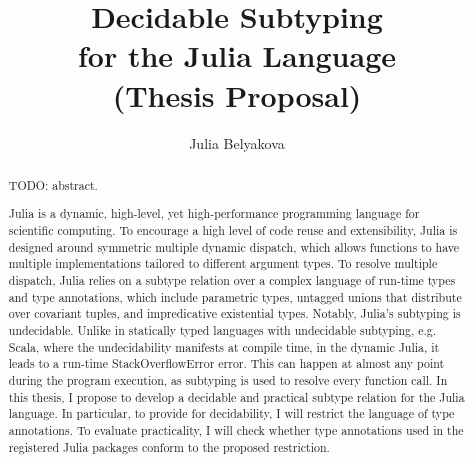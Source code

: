 \title{Decidable Subtyping\\for the Julia Language\\ (Thesis Proposal)}

\author{Julia Belyakova}

\date{}

\maketitle


\begin{abstract}
  TODO: abstract.

Julia is a dynamic, high-level, yet high-performance programming language
for scientific computing.
To encourage a high level of code reuse and extensibility, Julia is
designed around symmetric multiple dynamic dispatch, which allows functions
to have multiple implementations tailored to different argument types.
To resolve multiple dispatch, Julia relies on a subtype relation over a complex
language of run-time types and type annotations, which include parametric types,
untagged unions that distribute over covariant tuples, and impredicative
existential types.
Notably, Julia's subtyping is undecidable.
Unlike in statically typed languages
with undecidable subtyping, e.g. Scala, where the undecidability manifests at
compile time, in the dynamic Julia, it leads to a run-time
StackOverflowError error. This can happen
at almost any point during the program execution, as subtyping is used to
resolve every function call.
In this thesis, I propose to develop a decidable and practical subtype relation
for the Julia language.
In particular, to provide for decidability, I will restrict the language of type
annotations. To evaluate practicality, I will check whether type annotations
used in the registered Julia packages conform to the proposed restriction.

\end{abstract}
